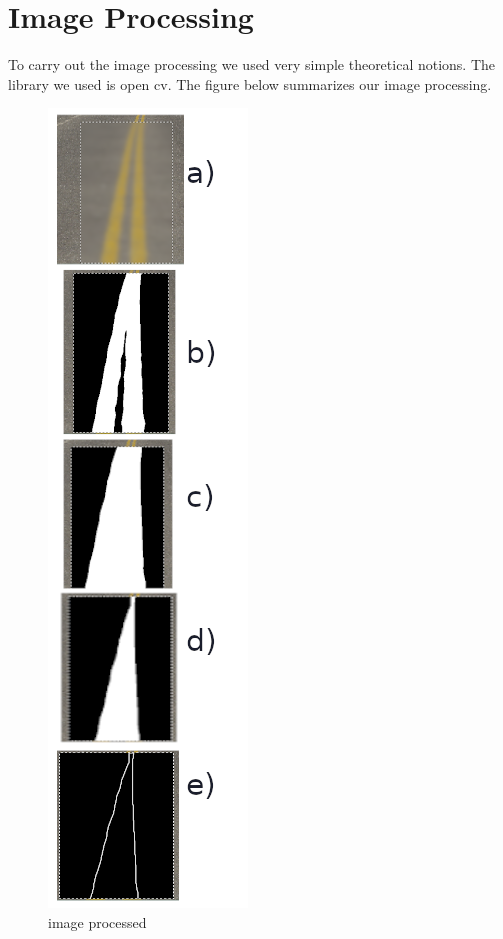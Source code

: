 \section{Image Processing}

To carry out the image processing we used very simple theoretical notions. The library we used is open cv. The figure below summarizes our image processing.
\begin{figure}[ht!]
    \begin{center}
        \includegraphics[scale=0.3]{Images/diagramme.png}
    \end{center}
    \caption{image processed}
    \label{fig:img_processing}
\end{figure}

